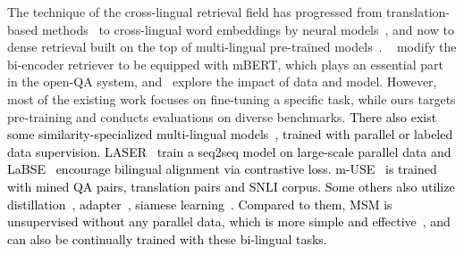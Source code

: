 \documentclass{article} %
\begin{document}
The technique of the cross-lingual retrieval field has progressed from translation-based methods~\citep{nie2010cross, shi-etal-2021-cross} to cross-lingual word embeddings by neural models~\citep{sun-duh-2020-clirmatrix}, and now to dense retrieval built on the top of multi-lingual pre-trained models~\citep{bert2019, conneau2019unsupervised}. ~\citet{asai-etal-2021-xor,asai2021one} modify the bi-encoder retriever to be equipped with mBERT, which plays an essential part in the open-QA system, and~\citet{zhang2022towards} explore the impact of data and model. However, most of the existing work focuses on fine-tuning a specific task, while ours targets pre-training and conducts evaluations on diverse benchmarks.
\textcolor{black}{
There also exist some similarity-specialized multi-lingual models~\citep{litschko2021evaluating}, trained with parallel or labeled data supervision. LASER~\citep{artetxe2019massively} train a seq2seq model on large-scale parallel data and LaBSE~\citep{feng-etal-2022-language} encourage bilingual alignment via contrastive loss. m-USE~\citep{yang2019multilingual} is trained with mined QA pairs, translation pairs and SNLI corpus. Some others also utilize distillation~\citep{reimers-gurevych-2020-making, li2021learning}, adapter~\citep{pfeiffer2020mad,litschko2022parameter}, siamese learning~\citep{zhang2021bootstrapped}. Compared to them, MSM is unsupervised without any parallel data, which is more simple and effective~\citep{artetxe2020call}, and can also be continually trained with these bi-lingual tasks.
}



\end{document}
